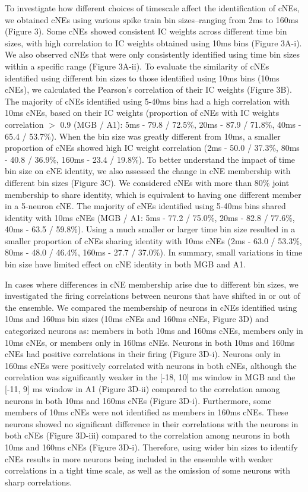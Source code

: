 \documentclass[11pt]{article}
\begin{document}
To investigate how different choices of timescale affect the identification of cNEs, we obtained cNEs using various spike train bin sizes--ranging from 2ms to 160ms (Figure 3). Some cNEs showed consistent IC weights across different time bin sizes, with high correlation to IC weights obtained using 10ms bins (Figure 3A-i). We also observed cNEs that were only consistently identified using time bin sizes within a specific range (Figure 3A-ii). To evaluate the similarity of cNEs identified using different bin sizes to those identified using 10ms bins (10ms cNEs), we calculated the Pearson's correlation of their IC weights (Figure 3B). The majority of cNEs identified using 5-40ms bins had a high correlation with 10ms cNEs, based on their IC weights (proportion of cNEs with IC weights correlation $>$ 0.9 (MGB / A1): 5ms - 79.8 / 72.5\%, 20ms - 87.9 / 71.8\%, 40ms - 65.4 / 53.7\%). When the bin size was greatly different from 10ms, a smaller proportion of cNEs showed high IC weight correlation (2ms - 50.0 / 37.3\%, 80ms - 40.8 / 36.9\%, 160ms - 23.4 / 19.8\%). To better understand the impact of time bin size on cNE identity, we also assessed the change in cNE membership with different bin sizes (Figure 3C). We considered cNEs with more than 80\% joint membership to share identity, which is equivalent to having one different member in a 5-neuron cNE. The majority of cNEs identified using 5-40ms bins shared identity with 10ms cNEs (MGB / A1: 5ms - 77.2 / 75.0\%, 20ms - 82.8 / 77.6\%, 40ms - 63.5 / 59.8\%). Using a much smaller or larger time bin size resulted in a smaller proportion of cNEs sharing identity with 10ms cNEs (2ms - 63.0 / 53.3\%, 80ms - 48.0 / 46.4\%, 160ms - 27.7 / 37.0\%). In summary, small variations in time bin size have limited effect on cNE identity in both MGB and A1.

In cases where differences in cNE membership arise due to different bin sizes, we investigated the firing correlations between neurons that have shifted in or out of the ensemble. We compared the membership of neurons in cNEs identified using 10ms and 160ms bin sizes (10ms cNEs and 160ms cNEs, Figure 3D) and categorized neurons as: members in both 10ms and 160ms cNEs, members only in 10ms cNEs, or members only in 160ms cNEs. Neurons in both 10ms and 160ms cNEs had positive correlations in their firing (Figure 3D-i). Neurons only in 160ms cNEs were positively correlated with neurons in both cNEs, although the correlation was significantly weaker in the [-18, 10] ms window in MGB and the [-11, 9] ms window in A1 (Figure 3D-ii) compared to the correlation among neurons in both 10ms and 160ms cNEs (Figure 3D-i). Furthermore, some members of 10ms cNEs were not identified as members in 160ms cNEs. These neurons showed no significant difference in their correlations with the neurons in both cNEs (Figure 3D-iii) compared to the correlation among neurons in both 10ms and 160ms cNEs (Figure 3D-i). Therefore, using wider bin sizes to identify cNEs results in more neurons being included in the ensemble with weaker correlations in a tight time scale, as well as the omission of some neurons with sharp correlations.
\end{document}
